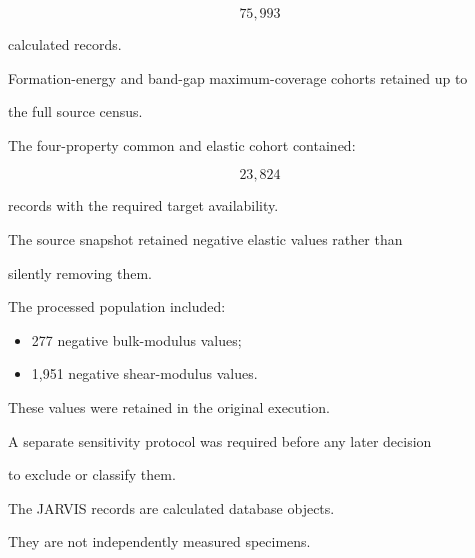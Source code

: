 \documentclass[11pt,a4paper,oneside]{report}
\begin{document}
\begin{equation}
75{,}993
\end{equation}



calculated records.



Formation-energy and band-gap maximum-coverage cohorts retained up to

the full source census.



The four-property common and elastic cohort contained:



\begin{equation}
23{,}824
\end{equation}



records with the required target availability.



The source snapshot retained negative elastic values rather than

silently removing them.



The processed population included:



\begin{itemize}



\item

277 negative bulk-modulus values;



\item

1,951 negative shear-modulus values.



\end{itemize}



These values were retained in the original execution.



A separate sensitivity protocol was required before any later decision

to exclude or classify them.



The JARVIS records are calculated database objects.



They are not independently measured specimens.
\end{document}
